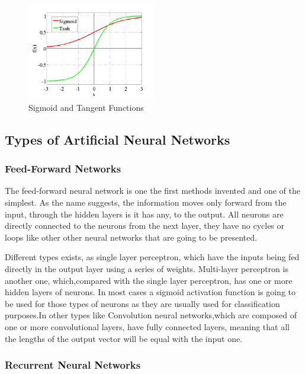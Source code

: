 \begin{figure}[htp]
	\centering
	\includegraphics[width=0.5\textwidth]{Illustrations/sigmoidandtangent.jpeg}
	\caption{Sigmoid and Tangent Functions}
	\label{fig:SigmoidAndTangent}
\end{figure}

\subsection{Types of Artificial Neural Networks}

\subsubsection{Feed-Forward Networks}

The feed-forward neural network is one the first methods invented and one of the simplest. As the name suggests, the information moves only forward from the input, through the hidden layers is it has any, to the output. All neurons are directly connected to the neurons from the next layer, they have no cycles or loops like other other neural networks that are going to be presented.

Different types exists, as single layer perceptron, which have the inputs being fed directly in the output layer using a series of weights. Multi-layer perceptron is another one, which,compared with the single layer perceptron, has one or more hidden layers of neurons.
In most cases a sigmoid activation function is going to be used for those types of neurons as they are usually used for classification purposes.In other types like Convolution neural networks,which are composed of one or more convolutional layers, have fully connected layers, meaning that all the lengths of the output vector will be equal with the input one.

\subsubsection{Recurrent Neural Networks}

